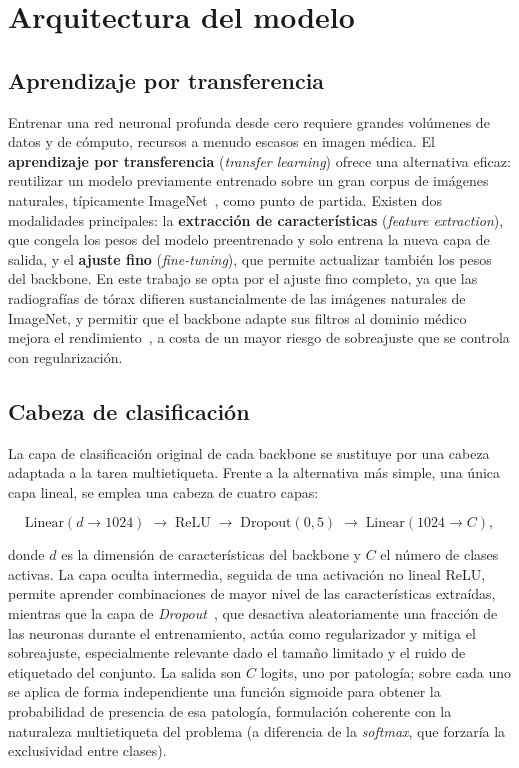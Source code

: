 \section{Arquitectura del modelo}
\label{sec::mm_arquitectura}

\subsection{Aprendizaje por transferencia}

Entrenar una red neuronal profunda desde cero requiere grandes volúmenes de datos
y de cómputo, recursos a menudo escasos en imagen médica. El \textbf{aprendizaje
por transferencia} (\textit{transfer learning}) ofrece una alternativa eficaz:
reutilizar un modelo previamente entrenado sobre un gran corpus de imágenes
naturales, típicamente ImageNet~\cite{dengImageNet2009}, como punto de partida.
Existen dos modalidades principales: la \textbf{extracción de características}
(\textit{feature extraction}), que congela los pesos del modelo preentrenado y
solo entrena la nueva capa de salida, y el \textbf{ajuste fino}
(\textit{fine-tuning}), que permite actualizar también los pesos del backbone. En
este trabajo se opta por el ajuste fino completo, ya que las radiografías de
tórax difieren sustancialmente de las imágenes naturales de ImageNet, y permitir
que el backbone adapte sus filtros al dominio médico mejora el
rendimiento~\cite{plestedDeepTransferLearning2026}, a costa de un mayor riesgo de
sobreajuste que se controla con regularización.

\subsection{Cabeza de clasificación}

La capa de clasificación original de cada backbone se sustituye por una cabeza
adaptada a la tarea multietiqueta. Frente a la alternativa más simple, una única
capa lineal, se emplea una cabeza de cuatro capas:

\begin{equation*}
\text{Linear}(d \rightarrow 1024) \;\rightarrow\; \text{ReLU} \;\rightarrow\;
\text{Dropout}(0{,}5) \;\rightarrow\; \text{Linear}(1024 \rightarrow C),
\end{equation*}

donde $d$ es la dimensión de características del backbone y $C$ el número de
clases activas. La capa oculta intermedia, seguida de una activación no lineal
ReLU, permite aprender combinaciones de mayor nivel de las características
extraídas, mientras que la capa de \textit{Dropout}~\cite{srivastavaDropout2014},
que desactiva aleatoriamente una fracción de las neuronas durante el
entrenamiento, actúa como regularizador y mitiga el sobreajuste, especialmente
relevante dado el tamaño limitado y el ruido de etiquetado del conjunto. La salida
son $C$ logits, uno por patología; sobre cada uno se aplica de forma independiente
una función sigmoide para obtener la probabilidad de presencia de esa patología,
formulación coherente con la naturaleza multietiqueta del problema (a diferencia
de la \textit{softmax}, que forzaría la exclusividad entre clases).

